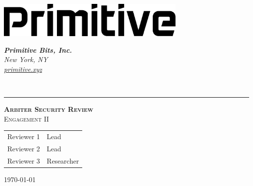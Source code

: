 \begin{titlepage}
  \begin{minipage}[c]{0.4\textwidth}
    \includegraphics[width=0.70\textwidth]{img/primitive-wordmark-dark.png} \\  %
  \end{minipage}
  \hspace{0.4\textwidth}
  \begin{minipage}[c]{0.2\textwidth}
    \begin{flushleft}
        \small
        \textit{\textbf{Primitive Bits, Inc.}\\  %
        New York, NY\\
        \href{http://primitive.xyz}{primitive.xyz}\\}
    \end{flushleft}
  \end{minipage} \\
  \begin{flushleft}
    {\small\color{gray}{
    \today}}
    \vspace{2cm}  %
    \hspace{2cm}  %
    \hspace{2cm}  %
    \hrule 
    \vspace{0.5cm}  %
    \hspace{2cm}  %
    \hspace{2cm}  %
  \end{flushleft}
  \begin{flushleft}
    \textsc{\LARGE \bfseries Arbiter Security Review}\\[0.5 cm]  %
    \textsc{\large Engagement II}\\[2.0 cm]  %

    \begin{tabular}{ll}  %
      Reviewer 1 & Lead \\
      Reviewer 2 & Lead \\
      Reviewer 3 & Researcher \\
    \end{tabular}

    \vfill

    {\large \today}  %
  \end{flushleft}
\end{titlepage}
